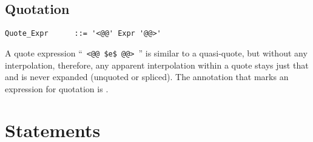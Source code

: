 \subsection{Quotation}
\label{sec:quotation}

\syntax\begin{lstlisting}
Quote_Expr      ::= '<@@' Expr '@@>'
\end{lstlisting}

A quote expression ``~\lstinline!<@@ $e$ @@>!~'' is similar to a quasi-quote, but without any interpolation, therefore, any apparent interpolation within a quote stays just that and is never expanded (unquoted or spliced). The annotation that marks an expression for quotation is . 





\section{Statements}
\label{sec:statements}

